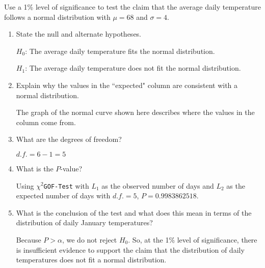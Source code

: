 \documentclass{article}
\begin{document}
\begin{enumerate}
Use a 1\% level of significance to test the claim that the average daily temperature follows a normal distribution with $\mu = 68$ and $\sigma = 4$.

	\begin{enumerate}
	\item State the null and alternate hypotheses. 
	
	{\answer 
	$H_0$: The average daily temperature fits the normal distribution. 
	
	$H_1$: The average daily temperature does not fit the normal distribution. 
	} 
	
	\item Explain why the values in the ``expected" column are consistent with a normal distribution. 
	
	{\answer 
	The graph of the normal curve shown here describes where the values in the column come from.}
	\vspace{2cm}
	
	\item What are the degrees of freedom? 
	
	{\answer 
	$d.f.=6-1 = 5$
	} 
	
	\item What is the $P$-value? 
	
	{\answer 
	Using \texttt{$\chi^2$GOF-Test} with $L_1$ as the observed number of days and $L_2$ as the expected number of days with $d.f. = 5$, $P=0.9983862518$.
	} 
	
	\item What is the conclusion of the test and what does this mean in terms of the distribution of daily January temperatures? 
	
	{\answer 
	Because $P > \alpha$, we do not reject $H_0$.  So, at the 1\% level of significance, there is insufficient evidence to support the claim that the distribution of daily temperatures does not fit a normal distribution.
	} 
	
	\end{enumerate}
	
\end{enumerate}
\vfill
\end{document}
